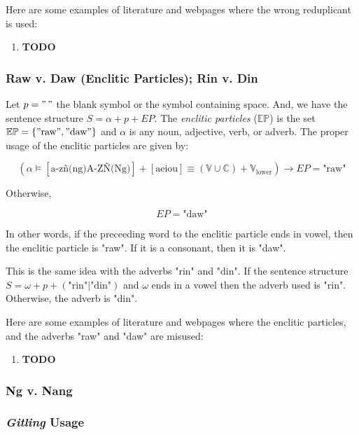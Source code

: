 Here are some examples of literature and webpages where the wrong reduplicant is
used:
\begin{enumerate}
    \item \textbf{TODO}
\end{enumerate}

\subsubsection{Raw v. Daw (Enclitic Particles); Rin v. Din}

Let \(p = "\,"\) the blank symbol or the symbol containing space. And, we have the
sentence structure \(S = \alpha + p + EP\). The \textit{enclitic particles}
(\(\mathbb{EP}\)) is the set \(\mathbb{EP} = \{"\text{raw}", "\text{daw}"\}\) and
\(\alpha\) is any noun, adjective, verb, or adverb. The proper usage of the enclitic
particles are given by:

\[
    \left(\alpha \models \left[\text{a-zñ(ng)A-ZÑ(Ng)}\right]+\left[\text{aeiou}\right] \equiv (\mathbb{V}\cup\mathbb{C}) + \mathbb{V}_\text{lower}\right)
    \longrightarrow EP = \text{"raw"}
\]

Otherwise,

\[
    EP = \text{"daw"}
\]

In other words, if the preceeding word to the enclitic particle ends in vowel,
then the enclitic particle is "raw". If it is a consonant, then it is "daw".

This is the same idea with the adverbs "rin" and "din". If the sentence structure
\(S = \omega + p + (\text{"rin"}|\text{"din"})\) and \(\omega\) ends in a vowel
then the adverb used is "rin". Otherwise, the adverb is "din".

Here are some examples of literature and webpages where the enclitic particles,
and the adverbs "raw" and "daw" are misused:
\begin{enumerate}
    \item \textbf{TODO}
\end{enumerate}

\subsubsection{Ng v. Nang}

\subsubsection{\textit{Gitling} Usage}